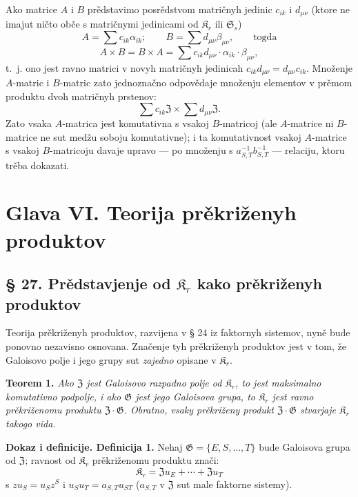 \documentclass[11pt]{article}
\begin{document}
Ako matrice \(A\) i \(B\) prědstavimo posrědstvom matričnyh jedinic \(c_{ik}\) i \(d_{\mu\nu}\) (ktore ne imajut ničto obče s matričnymi jedinicami od \(\mathfrak K_r\) ili \(\mathfrak S_s\))
\[
A=\sum c_{ik}\alpha_{ik};\qquad
B=\sum d_{\mu\nu}\beta_{\mu\nu},\qquad\text{togda}
\]
\[
A\times B=B\times A
=\sum c_{ik}d_{\mu\nu}\cdot\alpha_{ik}\cdot\beta_{\mu\nu},
\]
t.~j. ono jest ravno matrici v novyh matričnyh jedinicah
\(c_{ik}d_{\mu\nu}=d_{\mu\nu}c_{ik}\). Množenje \(A\)-matric i \(B\)-matric zato jednoznačno odpovědaje množenju elementov v prěmom produktu dvoh matričnyh prstenov:
\[
\sum c_{ik}\mathfrak Z\times\sum d_{\mu\nu}\mathfrak Z.
\]
Zato vsaka \(A\)-matrica jest komutativna s vsakoj \(B\)-matricoj (ale \(A\)-matrice ni \(B\)-matrice ne sut medžu soboju komutativne); i ta komutativnost vsakoj \(A\)-matrice s vsakoj \(B\)-matricoju davaje upravo --- po množenju s \(a_{S,T}^{-1}b_{S,T}^{-1}\) --- relaciju, ktoru trěba dokazati.

\section*{Glava VI. Teorija prěkriženyh produktov}\label{kapitel-vi.-theorie-der-verschraenkten-produkte}

\subsection*{§ 27. Prědstavjenje od \(\mathfrak K_r\) kako prěkriženyh produktov}

Teorija prěkriženyh produktov, razvijena v § 24 iz faktornyh sistemov, nyně bude ponovno nezavisno osnovana. Značenje tyh prěkriženyh produktov jest v tom, že Galoisovo polje i jego grupy sut \emph{zajedno} opisane v \(\mathfrak K_r\).

\noindent\textbf{Teorem 1.} \emph{Ako \(\mathfrak Z\) jest Galoisovo razpadno polje od \(\mathfrak K_r\), to jest maksimalno komutativno podpolje, i ako \(\mathfrak G\) jest jego Galoisova grupa, to \(\mathfrak K_r\) jest ravno prěkriženomu produktu \(\mathfrak Z\cdot\mathfrak G\). Obratno, vsaky prěkriženy produkt \(\mathfrak Z\cdot\mathfrak G\) stvarjaje \(\mathfrak K_r\) takogo vida.}

\noindent\textbf{Dokaz i definicije. Definicija 1.} Nehaj \(\mathfrak G=\{E,S,\ldots,T\}\) bude Galoisova grupa od \(\mathfrak Z\); ravnost od \(\mathfrak K_r\) prěkriženomu produktu znači:
\[
\mathfrak K_r=\mathfrak Zu_E+\cdots+\mathfrak Zu_T
\]
s \(zu_S=u_Sz^S\) i \(u_Su_T=a_{S,T}u_{ST}\) (\(a_{S,T}\) v \(\mathfrak Z\) sut male faktorne sistemy).
\end{document}
